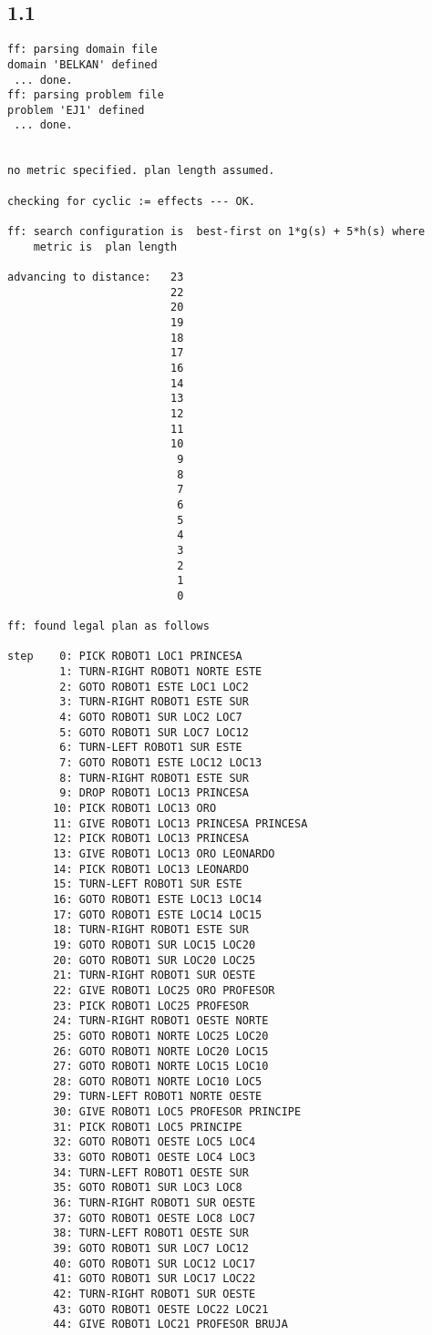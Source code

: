 \documentclass{article}
\begin{document}
\subsection*{1.1}
\begin{lstlisting}
ff: parsing domain file
domain 'BELKAN' defined
 ... done.
ff: parsing problem file
problem 'EJ1' defined
 ... done.


no metric specified. plan length assumed.

checking for cyclic := effects --- OK.

ff: search configuration is  best-first on 1*g(s) + 5*h(s) where
    metric is  plan length

advancing to distance:   23
                         22
                         20
                         19
                         18
                         17
                         16
                         14
                         13
                         12
                         11
                         10
                          9
                          8
                          7
                          6
                          5
                          4
                          3
                          2
                          1
                          0

ff: found legal plan as follows

step    0: PICK ROBOT1 LOC1 PRINCESA
        1: TURN-RIGHT ROBOT1 NORTE ESTE
        2: GOTO ROBOT1 ESTE LOC1 LOC2
        3: TURN-RIGHT ROBOT1 ESTE SUR
        4: GOTO ROBOT1 SUR LOC2 LOC7
        5: GOTO ROBOT1 SUR LOC7 LOC12
        6: TURN-LEFT ROBOT1 SUR ESTE
        7: GOTO ROBOT1 ESTE LOC12 LOC13
        8: TURN-RIGHT ROBOT1 ESTE SUR
        9: DROP ROBOT1 LOC13 PRINCESA
       10: PICK ROBOT1 LOC13 ORO
       11: GIVE ROBOT1 LOC13 PRINCESA PRINCESA
       12: PICK ROBOT1 LOC13 PRINCESA
       13: GIVE ROBOT1 LOC13 ORO LEONARDO
       14: PICK ROBOT1 LOC13 LEONARDO
       15: TURN-LEFT ROBOT1 SUR ESTE
       16: GOTO ROBOT1 ESTE LOC13 LOC14
       17: GOTO ROBOT1 ESTE LOC14 LOC15
       18: TURN-RIGHT ROBOT1 ESTE SUR
       19: GOTO ROBOT1 SUR LOC15 LOC20
       20: GOTO ROBOT1 SUR LOC20 LOC25
       21: TURN-RIGHT ROBOT1 SUR OESTE
       22: GIVE ROBOT1 LOC25 ORO PROFESOR
       23: PICK ROBOT1 LOC25 PROFESOR
       24: TURN-RIGHT ROBOT1 OESTE NORTE
       25: GOTO ROBOT1 NORTE LOC25 LOC20
       26: GOTO ROBOT1 NORTE LOC20 LOC15
       27: GOTO ROBOT1 NORTE LOC15 LOC10
       28: GOTO ROBOT1 NORTE LOC10 LOC5
       29: TURN-LEFT ROBOT1 NORTE OESTE
       30: GIVE ROBOT1 LOC5 PROFESOR PRINCIPE
       31: PICK ROBOT1 LOC5 PRINCIPE
       32: GOTO ROBOT1 OESTE LOC5 LOC4
       33: GOTO ROBOT1 OESTE LOC4 LOC3
       34: TURN-LEFT ROBOT1 OESTE SUR
       35: GOTO ROBOT1 SUR LOC3 LOC8
       36: TURN-RIGHT ROBOT1 SUR OESTE
       37: GOTO ROBOT1 OESTE LOC8 LOC7
       38: TURN-LEFT ROBOT1 OESTE SUR
       39: GOTO ROBOT1 SUR LOC7 LOC12
       40: GOTO ROBOT1 SUR LOC12 LOC17
       41: GOTO ROBOT1 SUR LOC17 LOC22
       42: TURN-RIGHT ROBOT1 SUR OESTE
       43: GOTO ROBOT1 OESTE LOC22 LOC21
       44: GIVE ROBOT1 LOC21 PROFESOR BRUJA



\end{lstlisting}
\end{document}
